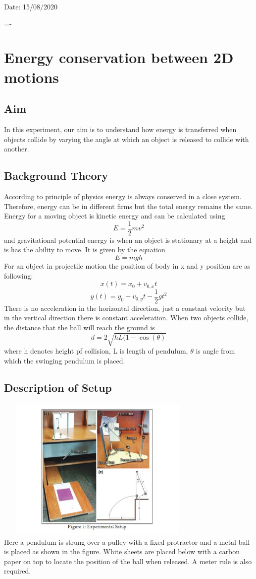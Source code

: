 Date: 15/08/2020

=-\chapter{Energy conservation between 2D motions}


\section{Aim}

In this experiment, our aim is to understand how energy is transferred when objects collide by varying the angle at which an object is released to collide with another.


\section{Background Theory}

 According to principle of physics energy is always conserved in a close system. Therefore, energy can be in different firms but the total energy remains the same. 
Energy for a moving object is kinetic energy and can be calculated using 
$$ E=\frac{1}{2} m v^2$$
and gravitational potential energy is when an object is stationary at a height and is has the ability to move. It is given by the equation $$E=mgh$$
For an object in projectile motion the position of body in x and y position are as following:
$$x(t) =x_0 +v_{0,x}t $$ 
$$y(t)= y_0 +v_{0,y}t -\frac {1}{2}gt^2$$
There is no acceleration in the horizontal direction, just a constant velocity but in the vertical direction there is constant acceleration. 
When two objects collide, the distance that the ball will reach the ground is 
$$d=2\sqrt{hL(1-\cos(\theta)}$$ where h denotes height pf collision, L is length of pendulum, $\theta$ is angle from which the swinging pendulum is placed. 

\section{Description of Setup}
\includegraphics[width=10cm, height=7cm]{figures/figm.jpeg} \\
Here a pendulum is strung over a pulley with a fixed protractor and a metal ball is placed as shown in the figure. White sheets are placed below with a carbon paper on top to locate the position of the ball when released. A meter rule is also required.

